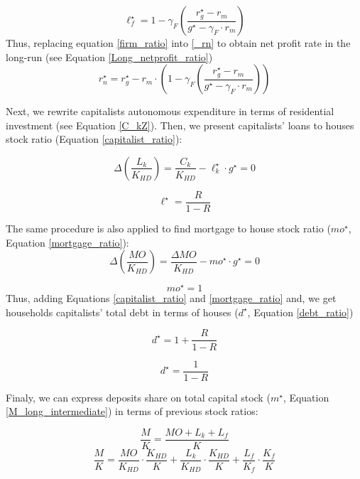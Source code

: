 \documentclass[12pt]{article}
\begin{document}
\begin{equation}
\label{firm_ratio}
\ell_f^\star = 1 - \gamma_F\left(\frac{r_g^\star - r_m}{g^\star - \gamma_F\cdot r_m}\right)
\end{equation}
Thus, replacing equation \ref{firm_ratio} into \ref{_rn} to obtain net profit rate in the long-run (see Equation \ref{Long_netprofit_ratio})
\begin{equation}
\label{Long_netprofit_ratio}
r_n^\star = r_g^\star - r_m\cdot \left(1 - \gamma_F\left(\frac{r_g^\star - r_m}{g^\star - \gamma_F\cdot r_m}\right)\right)
\end{equation}



Next, we rewrite capitalists autonomous expenditure in terms of residential investment (see Equation \ref{C_kZ}). 
Then, we  present capitalists' loans to houses stock ratio (Equation \ref{capitalist_ratio}):

$$
\Delta \left(\frac{L_k}{K_{HD}}\right) = \frac{C_k}{K_{HD}} - \ell^{\star}_{k}\cdot g^{\star} = 0
$$

\begin{equation}
\label{capitalist_ratio}
\ell^\star = \frac{R}{1-R}
\end{equation}

The same procedure is also applied to find mortgage to house stock ratio (\(mo^{\star}\), Equation \ref{mortgage_ratio}):
$$
\Delta \left(\frac{MO}{K_{HD}}\right) = \frac{\Delta MO}{K_{HD}} - mo^{\star}\cdot g^{\star} = 0
$$

\begin{equation}
\label{mortgage_ratio}
mo^\star = 1
\end{equation}
Thus, adding Equations \ref{capitalist_ratio} and \ref{mortgage_ratio} and, we get households capitalists' total debt in terms of houses (\(d^\star\), Equation \ref{debt_ratio})

$$
d^\star = 1 + \frac{R}{1-R}
$$

\begin{equation}
\label{debt_ratio}
d^\star = \frac{1}{1-R}
\end{equation}

Finaly, we can express deposits share on total capital stock (\(m^{\star}\), Equation \ref{M_long_intermediate}) in terms of previous stock ratios:

$$
\frac{M}{K} = \frac{MO + L_k + L_f}{K}
$$
$$
\frac{M}{K} = \frac{MO}{K_{HD}}\cdot \frac{K_{HD}}{K} +  \frac{L_k}{K_{HD}}\cdot \frac{K_{HD}}{K} +  \frac{L_f}{K_{f}}\cdot \frac{K_{f}}{K}
$$
\end{document}
